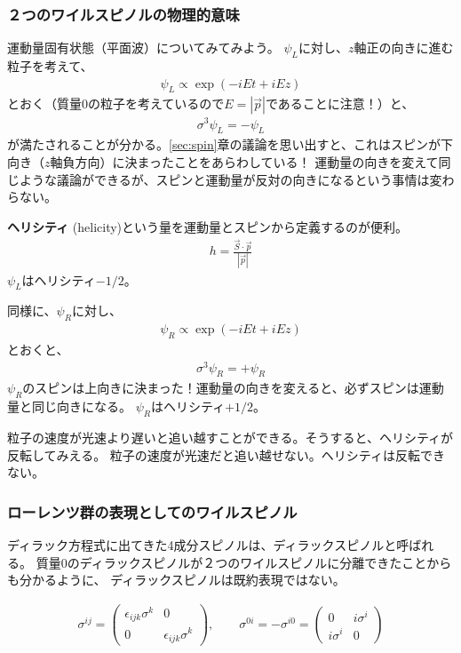 \documentclass[10pt,a4paper]{jarticle}
\begin{document}
\subsubsection{２つのワイルスピノルの物理的意味}
運動量固有状態（平面波）についてみてみよう。
$\psi_L$に対し、$z$軸正の向きに進む粒子を考えて、
\begin{align}
\psi_L \propto \exp( -iEt + i E z )
\end{align}
とおく（質量0の粒子を考えているので$E = |\vec p|$であることに注意！）と、
\begin{align}
\sigma^3 \psi_L = - \psi_L
\end{align}
が満たされることが分かる。\ref{sec:spin}章の議論を思い出すと、これはスピンが下向き（$z$軸負方向）に決まったことをあらわしている！
運動量の向きを変えて同じような議論ができるが、スピンと運動量が反対の向きになるという事情は変わらない。

\textbf{ヘリシティ} (helicity)という量を運動量とスピンから定義するのが便利。
\begin{align}
h = \frac{\vec S \cdot \vec p}{|\vec p|}
\end{align}
$\psi_L$はヘリシティ$-1/2$。

同様に、$\psi_R$に対し、
\begin{align}
\psi_R \propto \exp( -iEt + i E z )
\end{align}
とおくと、
\begin{align}
\sigma^3 \psi_R = + \psi_R
\end{align}
$\psi_R$のスピンは上向きに決まった！運動量の向きを変えると、必ずスピンは運動量と同じ向きになる。
$\psi_R$はヘリシティ$+1/2$。

粒子の速度が光速より遅いと追い越すことができる。そうすると、ヘリシティが反転してみえる。
粒子の速度が光速だと追い越せない。ヘリシティは反転できない。



\subsubsection{ローレンツ群の表現としてのワイルスピノル}
ディラック方程式に出てきた4成分スピノルは、ディラックスピノルと呼ばれる。
質量$0$のディラックスピノルが２つのワイルスピノルに分離できたことからも分かるように、
ディラックスピノルは既約表現ではない。

\begin{align}
\sigma^{ij} = \left(
\begin{array}{cc}
\epsilon_{ijk} \sigma^k & 0 \\
0 & \epsilon_{ijk} \sigma^k
\end{array}
\right)
, \qquad
\sigma^{0i} = -\sigma^{i0} = \left(
\begin{array}{cc}
0 & i\sigma^i \\
i\sigma^i & 0
\end{array}
\right)
\end{align}
\end{document}
